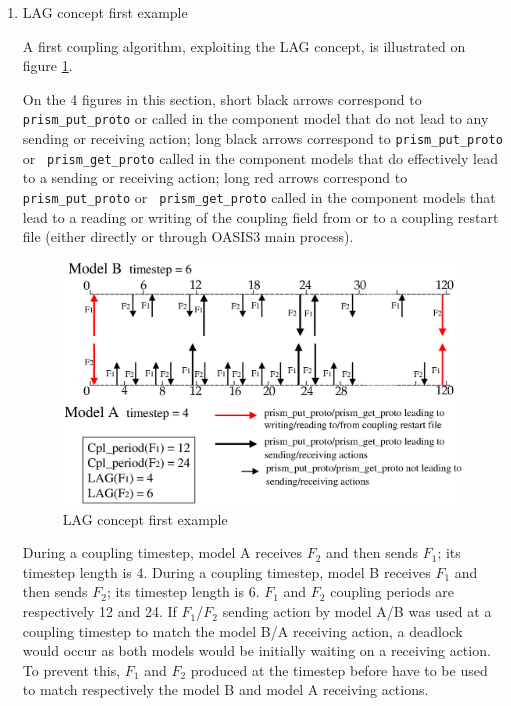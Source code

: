   \begin{enumerate}

  \item LAG concept first example
 
  A first coupling algorithm, exploiting the LAG concept, is
  illustrated on figure \ref{fig:lag_concept_1}. 


  On the 4 figures in this section, short black arrows correspond to {\tt
  prism\_put\_proto} or  called in the component model
  that do not lead to any sending or receiving action;
  long black arrows correspond to {\tt prism\_put\_proto} or {\tt
  prism\_get\_proto} called in the component models that do
  effectively lead to a sending or receiving action;
  long red arrows correspond to {\tt prism\_put\_proto} or {\tt
  prism\_get\_proto} called in the component models that lead to a
  reading or writing of the coupling field from or to a coupling
  restart file (either directly or through OASIS3 main process).

\begin{figure}
\includegraphics[scale=.6]{fig_lag_concept_1.eps}
\caption{LAG concept first example} 
\label{fig:lag_concept_1}
\end{figure}

  During a coupling timestep, model A receives $F_2$ and then sends $F_1$; its
  timestep length is 4. During a coupling timestep, model B receives $F_1$
  and then sends $F_2$; its timestep length is 6.  $F_1$ and $F_2$
  coupling periods are respectively 12 and 24. If $F_1$/$F_2$ sending
  action by model A/B was used at a coupling timestep to match the
  model B/A receiving action, a deadlock would occur as both models
  would be initially waiting on a receiving action. To prevent this,
  $F_1$ and $F_2$ produced at the timestep before have to be used to
  match respectively the model B and model A receiving actions.


\end{enumerate}
